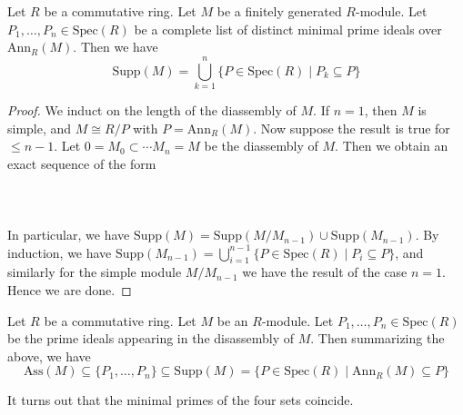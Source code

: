 \documentclass[a4paper]{article}
\begin{document}
\begin{lmm}{}{} Let $R$ be a commutative ring. Let $M$ be a finitely generated $R$-module. Let $P_1,\dots,P_n\in\text{Spec}(R)$ be a complete list of distinct minimal prime ideals over $\text{Ann}_R(M)$. Then we have $$\text{Supp}(M)=\bigcup_{k=1}^n\{P\in\text{Spec}(R)\;|\;P_k\subseteq P\}$$ 
\begin{proof}
We induct on the length of the diassembly of $M$. If $n=1$, then $M$ is simple, and $M\cong R/P$ with $P=\text{Ann}_R(M)$. Now suppose the result is true for $\leq n-1$. Let $0=M_0\subset\cdots M_n=M$ be the diassembly of $M$. Then we obtain an exact sequence of the form \\~\\
\\~\\
In particular, we have $\text{Supp}(M)=\text{Supp}(M/M_{n-1})\cup\text{Supp}(M_{n-1})$. By induction, we have $\text{Supp}(M_{n-1})=\bigcup_{i=1}^{n-1}\{P\in\text{Spec}(R)\;|\;P_i\subseteq P\}$, and similarly for the simple module $M/M_{n-1}$ we have the result of the case $n=1$. Hence we are done. 
\end{proof}
\end{lmm}

Let $R$ be a commutative ring. Let $M$ be an $R$-module. Let $P_1,\dots,P_n\in\text{Spec}(R)$ be the prime ideals appearing in the disassembly of $M$. Then summarizing the above, we have $$\text{Ass}(M)\subseteq\{P_1,\dots,P_n\}\subseteq\text{Supp}(M)=\{P\in\text{Spec}(R)\;|\;\text{Ann}_R(M)\subseteq P\}$$

It turns out that the minimal primes of the four sets coincide. 
\end{document}
